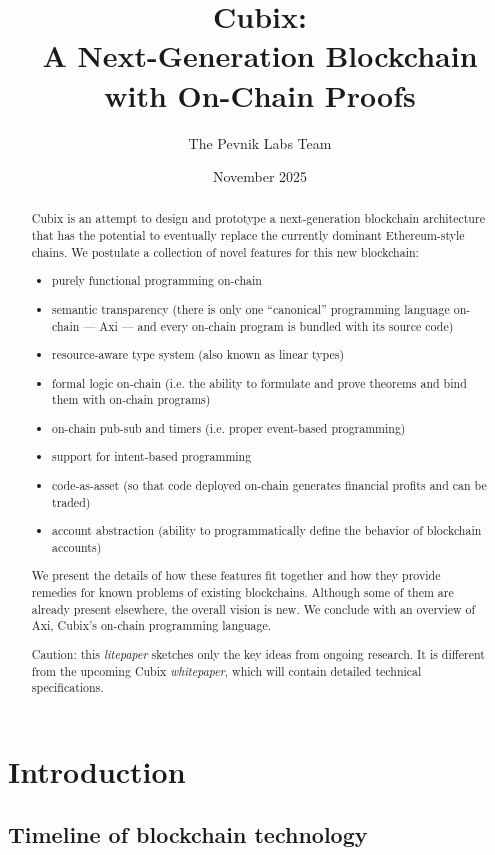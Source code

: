 \documentclass[a4paper]{article}
\title{Cubix: \\ A Next-Generation Blockchain with On-Chain Proofs}
\author{The Pevnik Labs Team}
\date{November 2025}
\begin{document}
\maketitle

\begin{abstract}
Cubix is an attempt to design and prototype a next-generation blockchain architecture that has the potential to eventually replace the currently dominant Ethereum-style chains. We postulate a collection of novel features for this new blockchain:

\begin{itemize}
  \item purely functional programming on-chain
  \item semantic transparency (there is only one ``canonical'' programming language on-chain --- Axi --- and every on-chain program is bundled with its source code)
  \item resource-aware type system (also known as linear types)
  \item formal logic on-chain (i.e. the ability to formulate and prove theorems and bind them with on-chain programs)
  \item on-chain pub-sub and timers (i.e. proper event-based programming)
  \item support for intent-based programming
  \item code-as-asset (so that code deployed on-chain generates financial profits and can be traded)
  \item account abstraction (ability to programmatically define the behavior of blockchain accounts)
\end{itemize}

We present the details of how these features fit together and how they provide remedies for known problems of existing blockchains. Although some of them are already present elsewhere, the overall vision is new. We conclude with an overview of Axi, Cubix's on-chain programming language.

Caution: this \textit{litepaper} sketches only the key ideas from ongoing research. It is different from the upcoming Cubix \textit{whitepaper}, which will contain detailed technical specifications.
\end{abstract}

\section{Introduction}

\subsection{Timeline of blockchain technology}
\end{document}
